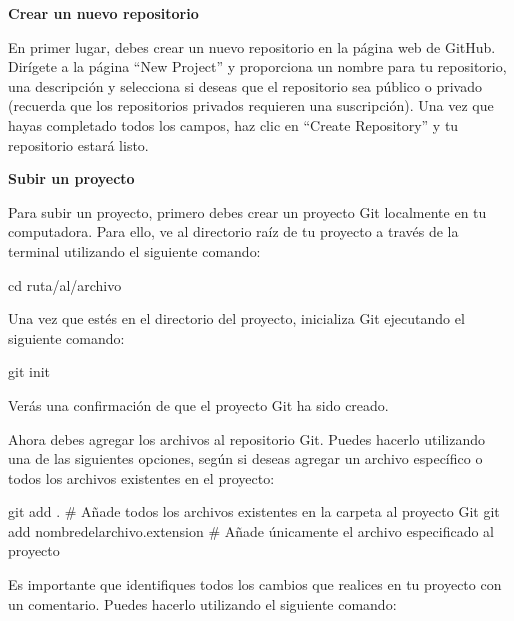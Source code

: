 \documentclass[
  letterpaper,
  DIV=11,
  numbers=noendperiod]{scrartcl}
\newenvironment{Shaded}{}{}
\newcommand{\BuiltInTok}[1]{\textcolor[rgb]{0.84,0.23,0.29}{#1}}
\newcommand{\CommentTok}[1]{\textcolor[rgb]{0.42,0.45,0.49}{#1}}
\newcommand{\FunctionTok}[1]{\textcolor[rgb]{0.44,0.26,0.76}{#1}}
\newcommand{\NormalTok}[1]{\textcolor[rgb]{0.14,0.16,0.18}{#1}}
\begin{document}
\textbf{Crear un nuevo repositorio}

En primer lugar, debes crear un nuevo repositorio en la página web de
GitHub. Dirígete a la página ``New Project'' y proporciona un nombre
para tu repositorio, una descripción y selecciona si deseas que el
repositorio sea público o privado (recuerda que los repositorios
privados requieren una suscripción). Una vez que hayas completado todos
los campos, haz clic en ``Create Repository'' y tu repositorio estará
listo.

\textbf{Subir un proyecto}

Para subir un proyecto, primero debes crear un proyecto Git localmente
en tu computadora. Para ello, ve al directorio raíz de tu proyecto a
través de la terminal utilizando el siguiente comando:

\begin{Shaded}
\begin{Highlighting}[]
\BuiltInTok{cd}\NormalTok{ ruta/al/archivo}
\end{Highlighting}
\end{Shaded}

Una vez que estés en el directorio del proyecto, inicializa Git
ejecutando el siguiente comando:

\begin{Shaded}
\begin{Highlighting}[]
\FunctionTok{git}\NormalTok{ init}
\end{Highlighting}
\end{Shaded}

Verás una confirmación de que el proyecto Git ha sido creado.

Ahora debes agregar los archivos al repositorio Git. Puedes hacerlo
utilizando una de las siguientes opciones, según si deseas agregar un
archivo específico o todos los archivos existentes en el proyecto:

\begin{Shaded}
\begin{Highlighting}[]
\FunctionTok{git}\NormalTok{ add .  }\CommentTok{\# Añade todos los archivos existentes en la carpeta al proyecto Git}
\FunctionTok{git}\NormalTok{ add nombredelarchivo.extension  }\CommentTok{\# Añade únicamente el archivo especificado al proyecto}
\end{Highlighting}
\end{Shaded}

Es importante que identifiques todos los cambios que realices en tu
proyecto con un comentario. Puedes hacerlo utilizando el siguiente
comando:
\end{document}
